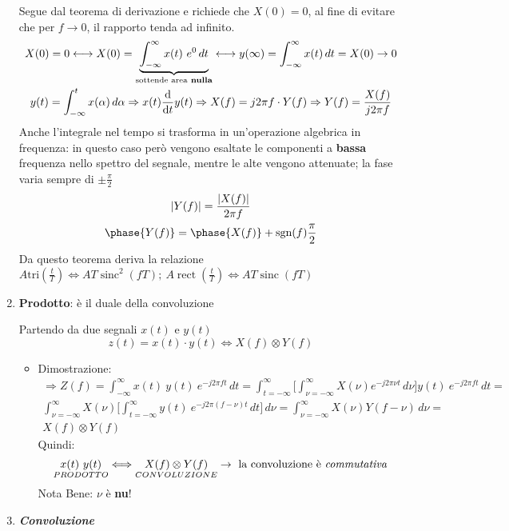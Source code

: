 \documentclass[
]{article}
\providecommand{\tightlist}{%
  \setlength{\itemsep}{0pt}\setlength{\parskip}{0pt}}
\begin{document}
\begin{enumerate}
  Segue dal teorema di derivazione e richiede che \(X(0)=0\), al fine di
  evitare che per \(f\to 0\), il rapporto tenda ad infinito.
  \begin{gather*}
  X(0)= 0 \longleftrightarrow X(0)=\underbrace{\int_{-\infty}^{\infty}x(t) \ e^{0}\,dt}_{\text{sottende area} \textbf{ nulla}} \longleftrightarrow y(\infty) = \int_{-\infty}^{\infty} x(t)\,dt = X(0) \to 0 \\ y(t) = \int_{-\infty}^{t} x(\alpha) \,d\alpha \Rightarrow x(t) \odv{}{t}y(t) \Rightarrow X(f)=j2\pi f\cdot Y(f) \Rightarrow Y(f) = \frac{X(f)}{j2\pi f}
  \end{gather*} Anche l'integrale nel tempo si trasforma in
  un'operazione algebrica in frequenza: in questo caso però vengono
  esaltate le componenti a \textbf{bassa} frequenza nello spettro del
  segnale, mentre le alte vengono attenuate; la fase varia sempre di
  \(\pm \frac{\pi}{2}\) \begin{gather*}
  |Y(f)| = \frac{|X(f)|}{2\pi f} \\ \phase{Y(f)} = \phase{X(f)} + \text{sgn}(f)\frac{\pi}{2}
  \end{gather*} Da questo teorema deriva la relazione
  \(A \text{tri}(\frac{t}{T})\Longleftrightarrow AT\mathop{\mathrm{sinc}}^{2}(fT); \ A\mathop{\mathrm{rect}}(\frac{t}{T})\Longleftrightarrow AT\mathop{\mathrm{sinc}}(fT)\)
\item
  \textbf{Prodotto}: è il duale della convoluzione

  Partendo da due segnali \(x(t)\) e \(y(t)\) \[
  z(t)=x(t)\cdot y(t) \Longleftrightarrow X(f) \otimes Y(f)
  \]

  \begin{itemize}
  \tightlist
  \item
    Dimostrazione: \begin{gather*}
    \Rightarrow Z(f) =  \int_{-\infty}^{\infty}x(t)\ y(t)\ e^{-j2\pi ft}\,dt = \int_{t=-\infty}^{\infty} \Big[ \int_{\nu = -\infty}^{\infty} X(\nu) e^{-j2\pi \nu t} \,d\nu \Big ] y(t)\ e^{-j2\pi ft}\,dt= \\ 
    \int_{\nu=-\infty}^{\infty} X(\nu) \Big[ \int_{t = -\infty}^{\infty}  y(t)\ e^{-j2\pi (f-\nu)t}\,dt \Big ] \,d\nu =  \int_{\nu = -\infty}^{\infty} X(\nu) Y(f-\nu) \,d\nu =
    \\ X(f) \otimes Y(f)
    \end{gather*} Quindi: \[
    \underset{PRODOTTO}{x(t) \ y(t)} \Longleftrightarrow \underset{CONVOLUZIONE}{X(f)\otimes Y(f)} \to \text{ la convoluzione è \textit{commutativa}}
    \] Nota Bene: \(\nu\) è \textbf{nu}!
  \end{itemize}
\item
  \textbf{\emph{Convoluzione}}


\end{enumerate}
\end{document}
